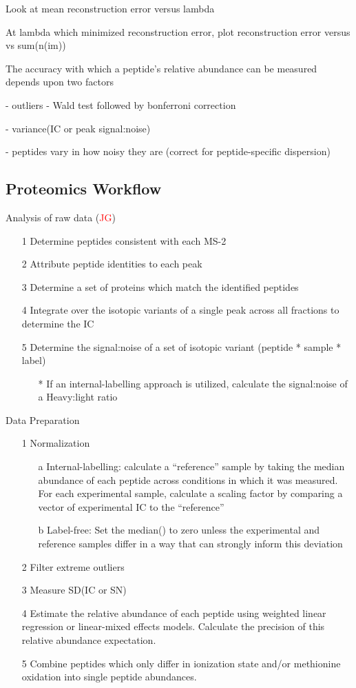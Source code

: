 \documentclass[12pt]{article}
\begin{document}
\color{red}
Look at mean reconstruction error versus lambda

At lambda which minimized reconstruction error, plot reconstruction error versus vs sum(n(im))
\color{black}



The accuracy with which a peptide's relative abundance can be measured depends upon two factors

- outliers - Wald test followed by bonferroni correction

- variance(IC or peak signal:noise)

- peptides vary in how noisy they are (correct for peptide-specific dispersion)


\subsection*{Proteomics Workflow}

Analysis of raw data (\textcolor{red}{JG})
\begin{itemize}
\item[1] Determine peptides consistent with each MS-2
\item[2] Attribute peptide identities to each peak
\item[3] Determine a set of proteins which match the identified peptides
\item[4] Integrate over the isotopic variants of a single peak across all fractions to determine the IC
\item[5] Determine the signal:noise of a set of isotopic variant (peptide * sample * label)
\begin{itemize}
\item[*] If an internal-labelling approach is utilized, calculate the signal:noise of a Heavy:light ratio
\end{itemize}
\end{itemize}

Data Preparation
\begin{itemize}
\item[1] Normalization
\begin{itemize}
\item[a] Internal-labelling: calculate a ``reference'' sample by taking the median abundance of each peptide across conditions in which it was measured.  For each experimental sample, calculate a scaling factor by comparing a vector of experimental IC to the ``reference''
\item[b] Label-free: Set the median() to zero unless the experimental and reference samples differ in a way that can strongly inform this deviation
\end{itemize}
\item[2] Filter extreme outliers
\item[3] Measure SD(IC or SN)
\item[4] Estimate the relative abundance of each peptide using weighted linear regression or linear-mixed effects models.  Calculate the precision of this relative abundance expectation.
\item[5] Combine peptides which only differ in ionization state and/or methionine oxidation into single peptide abundances.
\end{itemize}
\end{document}
